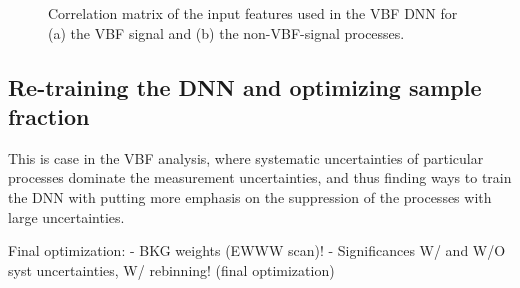 \dnnfigures


\begin{figure}[t]
    \caption{Correlation matrix of the input features used in the VBF DNN for (a) the VBF signal and (b) the non-VBF-signal processes.}
    \label{fig:dnn-features-correlations}
\end{figure}


\subsection{Re-training the DNN and optimizing sample fraction}
\label{subsec:sample-fraction-optimization}
This is case in the VBF analysis, where systematic uncertainties of particular processes dominate the measurement uncertainties, and thus finding ways to train the DNN with putting more emphasis on the suppression of the processes with large uncertainties. 

Final optimization:
-  BKG weights (EWWW scan)!
-  Significances W/ and W/O syst uncertainties, W/ rebinning! (final optimization)



\begin{figure}[t]
    \caption{}
    \label{fig:ew-fraction-scan}
\end{figure}

